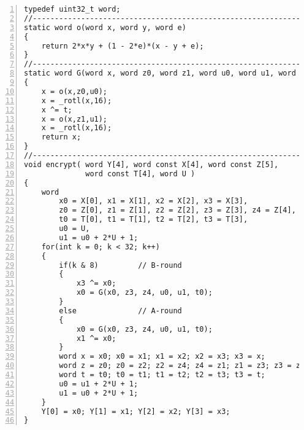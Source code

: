 \documentclass[a4paper,oneside,english]{amsart}
\numberwithin{equation}{section}
\numberwithin{figure}{section}
\begin{document}
\begin{lstlisting}[basicstyle={\scriptsize\ttfamily},numbers=left,numberstyle={\footnotesize},tabsize=4]
typedef uint32_t word; 
//----------------------------------------------------------------------
static word o(word x, word y, word e)
{
    return 2*x*y + (1 - 2*e)*(x - y + e);
}
//----------------------------------------------------------------------
static word G(word x, word z0, word z1, word u0, word u1, word t)
{   
    x = o(x,z0,u0);
    x = _rotl(x,16);
    x ^= t;
    x = o(x,z1,u1);
    x = _rotl(x,16);
    return x;
}
//----------------------------------------------------------------------
void encrypt( word Y[4], word const X[4], word const Z[5], 
              word const T[4], word U )
{
    word
        x0 = X[0], x1 = X[1], x2 = X[2], x3 = X[3],
        z0 = Z[0], z1 = Z[1], z2 = Z[2], z3 = Z[3], z4 = Z[4],
        t0 = T[0], t1 = T[1], t2 = T[2], t3 = T[3], 
        u0 = U,
        u1 = u0 + 2*U + 1;
    for(int k = 0; k < 32; k++)
    {
        if(k & 8)         // B-round
        {
            x3 ^= x0;
            x0 = G(x0, z3, z4, u0, u1, t0);
        }
        else              // A-round
        {
            x0 = G(x0, z3, z4, u0, u1, t0);
            x1 ^= x0;
        }
        word x = x0; x0 = x1; x1 = x2; x2 = x3; x3 = x;
        word z = z0; z0 = z2; z2 = z4; z4 = z1; z1 = z3; z3 = z;
        word t = t0; t0 = t1; t1 = t2; t2 = t3; t3 = t;
        u0 = u1 + 2*U + 1;
        u1 = u0 + 2*U + 1;
    }
    Y[0] = x0; Y[1] = x1; Y[2] = x2; Y[3] = x3;
}
\end{lstlisting}



\end{document}
